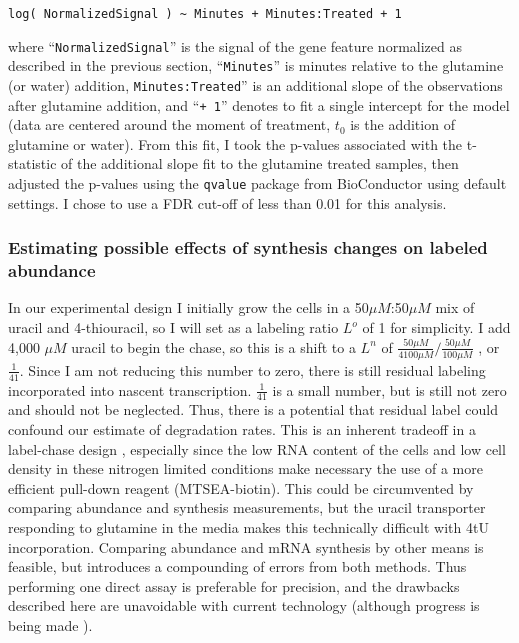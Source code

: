 \begin{verbatim}
log( NormalizedSignal ) ~ Minutes + Minutes:Treated + 1
\end{verbatim}

where ``\texttt{NormalizedSignal}'' is the signal of the gene feature
normalized as described in the previous section, ``\texttt{Minutes}'' is
minutes relative to the glutamine (or water) addition,
\texttt{Minutes:Treated}'' is an additional slope of the observations
after glutamine addition, and ``\texttt{+\ 1}'' denotes to fit a single
intercept for the model (data are centered around the moment of 
treatment, $t_0$ is the addition of glutamine or water). 
From this fit, I took the p-values associated
with the t-statistic of the additional slope fit to the glutamine
treated samples, then adjusted the p-values using the \texttt{qvalue}
package from BioConductor using default settings. I chose to use a FDR
cut-off of less than 0.01 for this analysis.

\subsubsection{Estimating possible effects of synthesis changes on 
labeled abundance}

In our experimental design I initially grow the cells in a
50\(\mu M\):50\(\mu M\) mix of uracil and 4-thiouracil, so I will set
as a labeling ratio \(L^o\) of 1 for simplicity. I add 4,000 \(\mu M\)
uracil to begin the chase, so this is a shift to a \(L^n\) of
\(\frac{50 \mu M}{4100 \mu M} / \frac{50 \mu M}{100 \mu M}\) , or
\(\frac{1}{41}\). Since I am not reducing this number to zero, there
is still residual labeling incorporated into nascent transcription.
\(\frac{1}{41}\) is a small number, but is still not zero and should
not be neglected.
Thus, there is a potential that residual label could confound our
estimate of degradation rates. This is an inherent tradeoff in a
label-chase design \parencite{perez2013eukaryotic}, 
especially since the low RNA content of the cells
and low cell density in these nitrogen limited conditions make necessary
the use of a more efficient pull-down reagent (MTSEA-biotin). This could
be circumvented by comparing abundance and synthesis measurements, but
the uracil transporter responding to glutamine in the media makes this
technically difficult with 4tU incorporation. Comparing abundance and
mRNA synthesis by other means is feasible, but introduces a compounding
of errors from both methods. Thus performing one direct assay is
preferable for precision, and the drawbacks described here are
unavoidable with current technology (although progress is being made
\parencite{chan2017non}).

